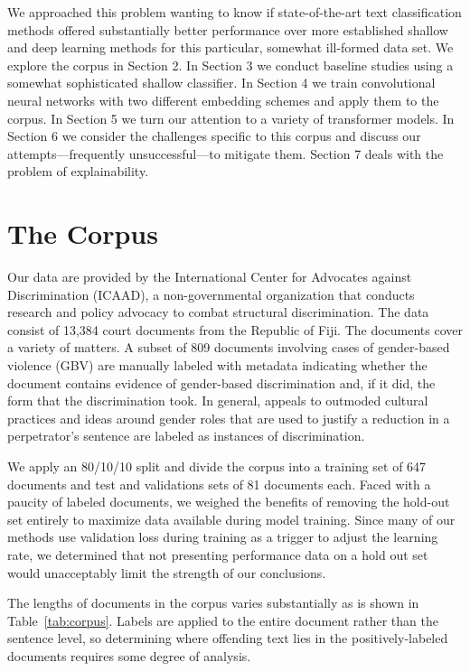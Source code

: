 \documentclass[twocolumn,10pt]{wmrDoc}
\begin{document}
We approached this problem wanting to know if state-of-the-art text classification methods offered substantially better performance over more established shallow and deep learning methods for this particular, somewhat ill-formed data set.  We explore the corpus in Section 2.  In Section 3 we conduct baseline studies using a somewhat sophisticated shallow classifier.  In Section 4 we train convolutional neural networks with two different embedding schemes and apply them to the corpus.  In Section 5 we turn our attention to a variety of transformer models.  In Section 6 we consider the challenges specific to this corpus and discuss our attempts---frequently unsuccessful---to mitigate them.  Section 7 deals with the problem of explainability.

\section{The Corpus}
Our data are provided by the International Center for Advocates against Discrimination (ICAAD), a non-governmental organization that conducts research and policy advocacy to combat structural discrimination. The data consist of 13,384 court documents from the Republic of Fiji. The documents cover a variety of matters. A subset of 809 documents involving cases of gender-based violence (GBV) are manually labeled with metadata indicating whether the document contains evidence of gender-based discrimination and, if it did, the form that the discrimination took. In general, appeals to outmoded cultural practices and ideas around gender roles that are used to justify a reduction in a perpetrator’s sentence are labeled as instances of discrimination.

We apply an 80/10/10 split and divide the corpus into a training set of 647 documents and test and validations sets of 81 documents each.  Faced with a paucity of labeled documents, we weighed the benefits of removing the hold-out set entirely to maximize data available during model training.  Since many of our methods use validation loss during training as a trigger to adjust the learning rate, we determined that not presenting performance data on a hold out set would unacceptably limit the strength of our conclusions.

The lengths of documents in the corpus varies substantially as is shown in Table~\ref{tab:corpus}. Labels are applied to the entire document rather than the sentence level, so determining where offending text lies in the positively-labeled documents requires some degree of analysis.
\end{document}
